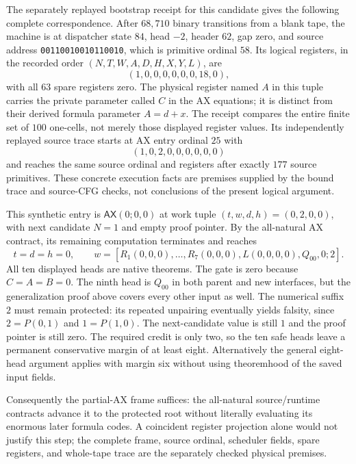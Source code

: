 The separately replayed bootstrap receipt for this candidate gives the
following complete correspondence.  After $68{,}710$ binary transitions
from a blank tape, the machine is at dispatcher state $84$, head $-2$,
header $62$, gap zero, and source address
\texttt{00110010010110010}, which is primitive ordinal $58$.  Its logical
registers, in the recorded order $(N,T,W,A,D,H,X,Y,L)$, are
\[
                         (1,0,0,0,0,0,0,18,0),
\]
with all $63$ spare registers zero.  The physical register named $A$
in this tuple carries the private parameter called $C$ in the AX
equations; it is distinct from their derived formula parameter $A=d+x$.
The receipt compares the entire
finite set of $100$ one-cells, not merely those displayed register values.
Its independently replayed source trace starts at AX entry ordinal $25$
with
\[
                         (1,0,2,0,0,0,0,0,0)
\]
and reaches the same source ordinal and registers after exactly $177$
source primitives.  These concrete execution facts are premises supplied
by the bound trace and source-CFG checks, not conclusions of the present
logical argument.

This synthetic entry is $\mathsf{AX}(0;0,0)$ at work tuple
$(t,w,d,h)=(0,2,0,0)$, with next candidate $N=1$ and empty proof pointer.
By the all-natural AX contract, its remaining computation terminates and
reaches
\[
 t=d=h=0,\qquad
 w=[R_1(0,0,0),\ldots,R_7(0,0,0),L(0,0,0,0),Q_00,0;2].
\]
All ten displayed heads are native theorems.  The gate is zero because
$C=A=B=0$.  The ninth head is $Q_00$ in both parent and new interfaces,
but the generalization proof above covers every other input as well.
The numerical suffix $2$ must remain protected: its repeated unpairing
eventually yields falsity, since $2=P(0,1)$ and $1=P(1,0)$.
The next-candidate value is still $1$ and the proof pointer is still zero.
The required credit is only two, so the ten safe heads leave a permanent
conservative margin of at least eight.  Alternatively the general
eight-head argument applies with margin six without using theoremhood of
the saved input fields.

Consequently the partial-AX frame suffices: the all-natural source/runtime
contracts advance it to the protected root without literally evaluating
its enormous later formula codes.  A coincident register projection alone
would not justify this step; the complete frame, source ordinal, scheduler
fields, spare registers, and whole-tape trace are the separately checked
physical premises.


